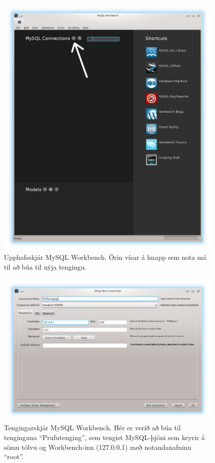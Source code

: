 \begin{figure}
\caption[Upphafsskjár MySQL Workbench]{Upphafsskjár MySQL Workbench. Örin vísar á hnapp sem nota má til að búa til nýja tengingu.}
\label{mynd:workbench-upphafsskjar}
\centering
\includegraphics[width=\linewidth]{myndir/workbench-upphafsskjar}
\end{figure}

\begin{figure}
\caption[Tengingarskjár MySQL Workbench]{Tengingarskjár MySQL Workbench. Hér er verið að búa til tenginguna ``Prufutenging'', sem tengist MySQL-þjóni sem keyrir á sömu tölvu og Workbench-inn (127.0.0.1) með notandanafninu ``root''.}
\label{mynd:workbench-login}
\centering
\includegraphics[width=\linewidth]{myndir/workbench-login}
\end{figure}

